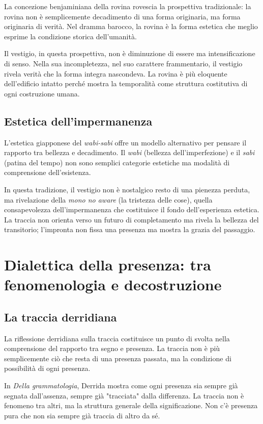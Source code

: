 \documentclass{gs}
\begin{document}
La concezione benjaminiana della rovina \cite{benjamin1928} rovescia la prospettiva tradizionale: la rovina non è semplicemente decadimento di una forma originaria, ma forma originaria di verità. Nel dramma barocco, la rovina è la forma estetica che meglio esprime la condizione storica dell'umanità.

Il vestigio, in questa prospettiva, non è diminuzione di essere ma intensificazione di senso. Nella sua incompletezza, nel suo carattere frammentario, il vestigio rivela verità che la forma integra nascondeva. La rovina è più eloquente dell'edificio intatto perché mostra la temporalità come struttura costitutiva di ogni costruzione umana.

\subsection{Estetica dell'impermanenza}

L'estetica giapponese del \textit{wabi-sabi} \cite{kuki1930} offre un modello alternativo per pensare il rapporto tra bellezza e decadimento. Il \textit{wabi} (bellezza dell'imperfezione) e il \textit{sabi} (patina del tempo) non sono semplici categorie estetiche ma modalità di comprensione dell'esistenza.

In questa tradizione, il vestigio non è nostalgico resto di una pienezza perduta, ma rivelazione della \textit{mono no aware} (la tristezza delle cose), quella consapevolezza dell'impermanenza che costituisce il fondo dell'esperienza estetica. La traccia non orienta verso un futuro di completamento ma rivela la bellezza del transitorio; l'impronta non fissa una presenza ma mostra la grazia del passaggio.

\section{Dialettica della presenza: tra fenomenologia e decostruzione}

\subsection{La traccia derridiana}

La riflessione derridiana sulla traccia \cite{derrida1967} costituisce un punto di svolta nella comprensione del rapporto tra segno e presenza. La traccia non è più semplicemente ciò che resta di una presenza passata, ma la condizione di possibilità di ogni presenza.

In \textit{Della grammatologia}, Derrida mostra come ogni presenza sia sempre già segnata dall'assenza, sempre già "tracciata" dalla differenza. La traccia non è fenomeno tra altri, ma la struttura generale della significazione. Non c'è presenza pura che non sia sempre già traccia di altro da sé.
\end{document}
